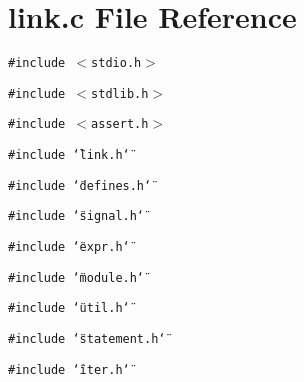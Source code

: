 \section{link.c File Reference}
\label{link_8c}
{\tt \#include $<$stdio.h$>$}\par
{\tt \#include $<$stdlib.h$>$}\par
{\tt \#include $<$assert.h$>$}\par
{\tt \#include \char`\"{}link.h\char`\"{}}\par
{\tt \#include \char`\"{}defines.h\char`\"{}}\par
{\tt \#include \char`\"{}signal.h\char`\"{}}\par
{\tt \#include \char`\"{}expr.h\char`\"{}}\par
{\tt \#include \char`\"{}module.h\char`\"{}}\par
{\tt \#include \char`\"{}util.h\char`\"{}}\par
{\tt \#include \char`\"{}statement.h\char`\"{}}\par
{\tt \#include \char`\"{}iter.h\char`\"{}}\par
